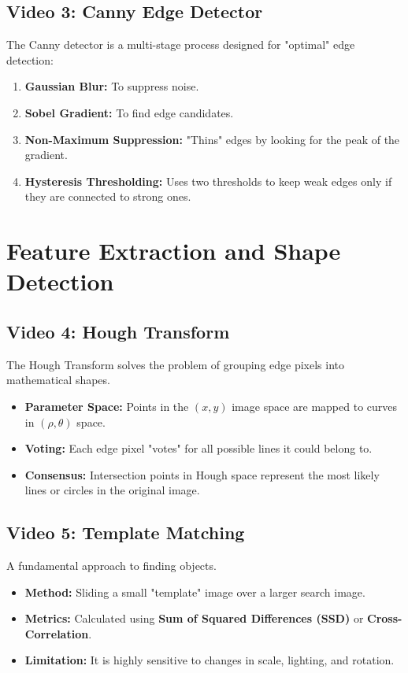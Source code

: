 \documentclass[11pt]{article}
\begin{document}
\subsection{Video 3: Canny Edge Detector}
The Canny detector is a multi-stage process designed for "optimal" edge detection:
\begin{enumerate}[noitemsep]
    \item \textbf{Gaussian Blur:} To suppress noise.
    \item \textbf{Sobel Gradient:} To find edge candidates.
    \item \textbf{Non-Maximum Suppression:} "Thins" edges by looking for the peak of the gradient.
    \item \textbf{Hysteresis Thresholding:} Uses two thresholds to keep weak edges only if they are connected to strong ones.
\end{enumerate}

\section{Feature Extraction and Shape Detection}

\subsection{Video 4: Hough Transform}
The Hough Transform solves the problem of grouping edge pixels into mathematical shapes.
\begin{itemize}
    \item \textbf{Parameter Space:} Points in the $(x, y)$ image space are mapped to curves in $(\rho, \theta)$ space.
    \item \textbf{Voting:} Each edge pixel "votes" for all possible lines it could belong to.
    \item \textbf{Consensus:} Intersection points in Hough space represent the most likely lines or circles in the original image.
\end{itemize}

\subsection{Video 5: Template Matching}
A fundamental approach to finding objects.
\begin{itemize}
    \item \textbf{Method:} Sliding a small "template" image over a larger search image.
    \item \textbf{Metrics:} Calculated using \textbf{Sum of Squared Differences (SSD)} or \textbf{Cross-Correlation}.
    \item \textbf{Limitation:} It is highly sensitive to changes in scale, lighting, and rotation.
\end{itemize}
\end{document}
